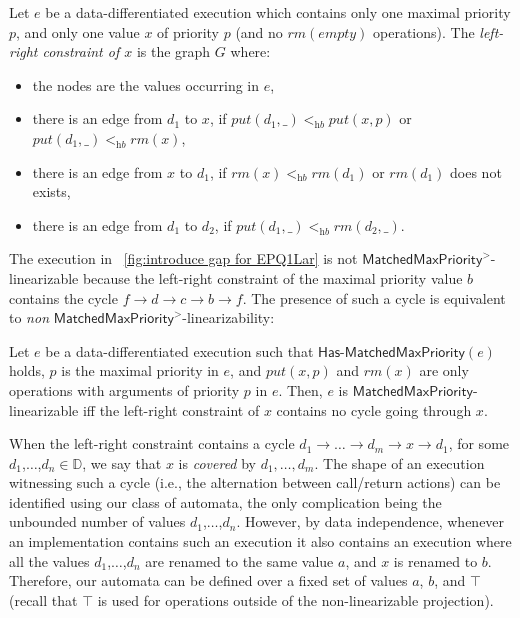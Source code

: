 \documentclass[a4paper,UKenglish]{lipics-v2016}
\begin{document}
\begin{definition}\label{def:left-right constraint for matched put and rm operations}
Let $e$ be a data-differentiated execution which contains only one maximal priority $p$, and only one value $x$ of priority $p$ (and no $\textit{rm}(\textit{empty})$ operations).
The \emph{left-right constraint of $x$} is the graph $G$ where: 
\begin{itemize}
\item the nodes are the values occurring in $e$, 
\item there is an edge from $d_1$ to $x$, if $\textit{put}(d_1,\_) <_{\textit{hb}} \textit{put}(x,p)$ or $\textit{put}(d_1,\_) <_{\textit{hb}} \textit{rm}(x)$,
\item there is an edge from $x$ to $d_1$, if $\textit{rm}(x)<_{\textit{hb}}\textit{rm}(d_1)$ or $\textit{rm}(d_1)$ does not exists,
\item there is an edge from $d_1$ to $d_2$, if $\textit{put}(d_1,\_) <_{\textit{hb}} \textit{rm}(d_2,\_)$.
\end{itemize}
\end{definition}

The execution in \figurename~\ref{fig:introduce gap for EPQ1Lar} is not $\mathsf{MatchedMaxPriority}^>$-linearizable because the left-right constraint of the maximal priority value $b$ contains the cycle $f \rightarrow d \rightarrow c \rightarrow b \rightarrow f$. The presence of such a cycle is equivalent to \emph{non} $\mathsf{MatchedMaxPriority}^>$-linearizability:

\begin{lemma}
\label{lemma:Lin Equals Constraint for EPQ1Lar}
Let $e$ be a data-differentiated execution such that 
$\mathsf{Has\text{-}MatchedMaxPriority}(e)$ holds, $p$ is the maximal priority in $e$, and $\textit{put}(x,p)$ and $\textit{rm}(x)$ are only operations with arguments of priority $p$ in $e$. 
Then, $e$ is $\mathsf{MatchedMaxPriority}$-linearizable iff the left-right constraint of $x$ contains no cycle going through $x$.
\end{lemma}

When the left-right constraint contains a cycle $d_1 \rightarrow \ldots \rightarrow d_m \rightarrow x \rightarrow d_1$, for some $d_1$,$\ldots$,$d_n\in \mathbb{D}$, we say that $x$ is \emph{covered} by $d_1,\ldots,d_m$. The shape of an execution witnessing such a cycle (i.e., the alternation between call/return actions) can be identified using our class of automata, the only complication being the unbounded number of values $d_1$,$\ldots$,$d_n$. However, by data independence, whenever an implementation contains such an execution it also contains an execution where all the values $d_1$,$\ldots$,$d_n$ are renamed to the same value $a$, and $x$ is renamed to $b$. Therefore, our automata can be defined over a fixed set of values $a$, $b$, and $\top$ (recall that $\top$ is used for operations outside of the non-linearizable projection).
\end{document}
